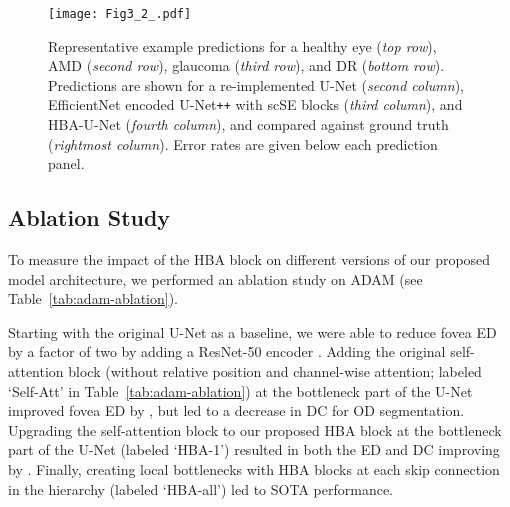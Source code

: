 \documentclass[hidelinks,runningheads]{llncs}
\begin{document}
\begin{figure}[!t]
    \centering
    \texttt{[image: Fig3\_2\_.pdf]}
    \caption{Representative example predictions for a healthy eye (\emph{top row}), \ac{AMD} (\emph{second row}), glaucoma (\emph{third row}), and \ac{DR} (\emph{bottom row}).
    Predictions are shown for a re-implemented U-Net (\emph{second column}), EfficientNet encoded U-Net\texttt{++} with scSE blocks (\emph{third column}), and HBA-U-Net (\emph{fourth column}), and compared against ground truth (\emph{rightmost column}). Error rates are given below each prediction panel.
    }
    \label{fig:example-predictions}
\end{figure}


\subsection{Ablation Study}

To measure the impact of the HBA block on different versions of our proposed model architecture, we performed an ablation study on ADAM (see Table~\ref{tab:adam-ablation}).

Starting with the original U-Net \cite{ronneberger_u-net_2015,meyer_pixel-wise_2018} as a baseline, we were able to reduce fovea \ac{ED} by a factor of two by adding a ResNet-50 encoder \cite{he_deep_2016}.
Adding the original self-attention block \cite{ramachandran_stand-alone_2019} (without relative position and channel-wise attention; labeled `Self-Att' in Table~\ref{tab:adam-ablation}) at the bottleneck part of the U-Net improved fovea \ac{ED} by , but led to a  decrease in \ac{DC} for \ac{OD} segmentation. 
Upgrading the self-attention block to our proposed HBA block at the bottleneck part of the U-Net (labeled `HBA-1') resulted in both the \ac{ED} and \ac{DC} improving by . Finally, creating local bottlenecks with HBA blocks at each skip connection in the hierarchy (labeled `HBA-all') led to \ac{SOTA} performance.
\end{document}
